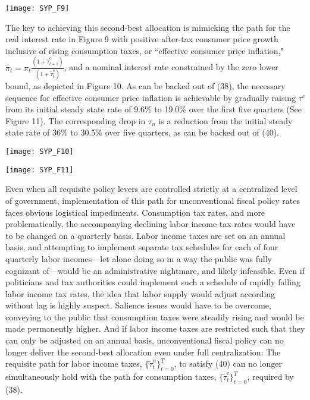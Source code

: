 \documentclass[12pt,letterpaper]{article}
\begin{document}
\begin{center}
\texttt{[image: SYP\_F9]}
\end{center}

The key to achieving this second-best allocation is mimicking the path for the real interest rate in Figure 9 with positive  after-tax consumer price growth inclusive of rising consumption taxes, or ``effective consumer price inflation," $\tilde{\pi}_t = \pi_t \frac{(1+\tilde{\tau}_{t+1}^c)}{(1+\tilde{\tau}_t^c)} $, and a nominal interest rate constrained by the zero lower bound, as depicted in Figure 10. As can be backed out of (38), the necessary sequence for effective consumer price inflation is achievable by gradually raising $\tau^c$ from its initial steady state rate of 9.6\% to 19.0\% over the first five quarters (See Figure 11). The corresponding drop in $\tau_n$ is a reduction from the initial steady state rate of 36\% to 30.5\% over five quarters, as can be backed out of (40). 

\begin{center}
\texttt{[image: SYP\_F10]}
\end{center}

\begin{center}
\texttt{[image: SYP\_F11]}
\end{center}

Even when all requisite policy levers are controlled strictly at a centralized level of government, implementation of this path for unconventional fiscal policy rates faces obvious logistical impediments. Consumption tax rates, and more problematically, the accompanying declining labor income tax rates would have to be changed on a quarterly basis. Labor income taxes are set on an annual basis, and attempting to implement separate tax schedules for each of four quarterly labor incomes---let alone doing so in a way the public was fully cognizant of---would be an administrative nightmare, and likely infeasible.  Even if politicians and tax authorities could implement such a schedule of rapidly falling labor income tax rates, the idea that labor supply would adjust according without lag is highly suspect. Salience issues would have to be overcome, conveying to the public that consumption taxes were steadily rising and would be made permanently higher. And if labor income taxes are restricted such that they can only be adjusted on an annual basis, unconventional fiscal policy can no longer deliver the second-best allocation even under full centralization: The requisite path for labor income taxes, $\{ \tilde{\tau}_t^n \}_{t=0}^{T}$, to satisfy (40) can no longer simultaneously hold with the path for consumption taxes, $\{ \tilde{\tau}_t^c \}_{t=0}^{T}$, required by (38). 
\end{document}
